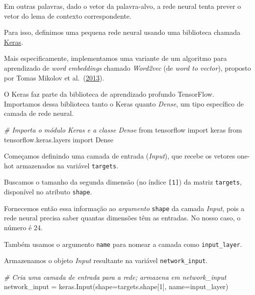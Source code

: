 \documentclass[
  brazilian,
]{article}
\newenvironment{Shaded}{}{}
\newcommand{\CommentTok}[1]{\textcolor[rgb]{0.38,0.63,0.69}{\textit{#1}}}
\newcommand{\DecValTok}[1]{\textcolor[rgb]{0.25,0.63,0.44}{#1}}
\newcommand{\ImportTok}[1]{#1}
\newcommand{\NormalTok}[1]{#1}
\newcommand{\OperatorTok}[1]{\textcolor[rgb]{0.40,0.40,0.40}{#1}}
\newcommand{\StringTok}[1]{\textcolor[rgb]{0.25,0.44,0.63}{#1}}
\begin{document}
Em outras palavras, dado o vetor da palavra-alvo, a rede neural tenta
prever o vetor do lema de contexto correspondente.

Para isso, definimos uma pequena rede neural usando uma biblioteca
chamada \href{https://keras.io/}{Keras}.

Mais especificamente, implementamos uma variante de um algoritmo para
aprendizado de \emph{word embeddings} chamado \emph{Word2vec} (de
\emph{word to vector}), proposto por Tomas Mikolov et
al.~(\href{https://arxiv.org/abs/1301.3781v3}{2013}).

O Keras faz parte da biblioteca de aprendizado profundo TensorFlow.
Importamos dessa biblioteca tanto o Keras quanto \emph{Dense}, um tipo
específico de camada de rede neural.

\begin{Shaded}
\begin{Highlighting}[]
\CommentTok{\# Importa o módulo Keras e a classe Dense}
\ImportTok{from}\NormalTok{ tensorflow }\ImportTok{import}\NormalTok{ keras}
\ImportTok{from}\NormalTok{ tensorflow.keras.layers }\ImportTok{import}\NormalTok{ Dense}
\end{Highlighting}
\end{Shaded}

Começamos definindo uma camada de entrada (\emph{Input}), que recebe os
vetores one-hot armazenados na variável \texttt{targets}.

Buscamos o tamanho da segunda dimensão (no índice \texttt{{[}1{]}}) da
matriz \texttt{targets}, disponível no atributo \texttt{shape}.

Fornecemos então essa informação ao \emph{argumento} \texttt{shape} da
camada \emph{Input}, pois a rede neural precisa saber quantas dimensões
têm as entradas. No nosso caso, o número é 24.

Também usamos o argumento \texttt{name} para nomear a camada como
\texttt{input\_layer}.

Armazenamos o objeto \emph{Input} resultante na variável
\texttt{network\_input}.

\begin{Shaded}
\begin{Highlighting}[]
\CommentTok{\# Cria uma camada de entrada para a rede; armazena em \textquotesingle{}network\_input\textquotesingle{}}
\NormalTok{network\_input }\OperatorTok{=}\NormalTok{ keras.Input(shape}\OperatorTok{=}\NormalTok{targets.shape[}\DecValTok{1}\NormalTok{], name}\OperatorTok{=}\StringTok{\textquotesingle{}input\_layer\textquotesingle{}}\NormalTok{)}
\end{Highlighting}
\end{Shaded}
\end{document}
